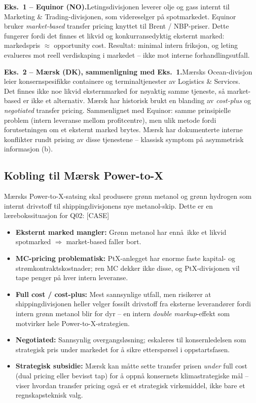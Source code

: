 \textbf{Eks.~1 -- Equinor (NO).}\quad [EKS]
Letingsdivisjonen leverer olje og gass internt til Marketing \& Trading-divisjonen, som videreselger på spotmarkedet. Equinor bruker \emph{market-based} transfer pricing knyttet til Brent / NBP-priser. Dette fungerer fordi det finnes et likvid og konkurransedyktig eksternt marked: markedspris $\approx$ opportunity cost. Resultat: minimal intern friksjon, og leting evalueres mot reell verdiskaping i markedet -- ikke mot interne forhandlingsutfall.

\textbf{Eks.~2 -- Mærsk (DK), sammenligning med Eks.~1.}\quad [EKS]
Mærsks Ocean-divisjon leier konsernspesifikke containere og terminaltjenester av Logistics \& Services. Det finnes ikke noe likvid eksternmarked for nøyaktig samme tjeneste, så market-based er ikke et alternativ. Mærsk har historisk brukt en blanding av \emph{cost-plus} og \emph{negotiated} transfer pricing. Sammenlignet med Equinor: samme prinsipielle problem (intern leveranse mellom profitcentre), men ulik metode fordi forutsetningen om et eksternt marked brytes. Mærsk har dokumenterte interne konflikter rundt prising av disse tjenestene -- klassisk symptom på asymmetrisk informasjon (b).

\subsection*{Kobling til Mærsk Power-to-X}
Mærsks Power-to-X-satsing skal produsere grønn metanol og grønn hydrogen som internt drivstoff til shippingdivisjonens nye metanol-skip. Dette er en lærebokssituasjon for Q02: [CASE]
\begin{itemize}\setlength{\itemsep}{2pt}
\item \textbf{Eksternt marked mangler:} Grønn metanol har enn\aa\ ikke et likvid spotmarked $\Rightarrow$ market-based faller bort.
\item \textbf{MC-pricing problematisk:} PtX-anlegget har enorme faste kapital- og strømkontraktskostnader; ren MC dekker ikke disse, og PtX-divisjonen vil tape penger på hver intern leveranse.
\item \textbf{Full cost / cost-plus:} Mest sannsynlige utfall, men risikerer at shippingdivisjonen heller velger fossilt drivstoff fra eksterne leverandører fordi intern grønn metanol blir for dyr -- en intern \emph{double markup}-effekt som motvirker hele Power-to-X-strategien.
\item \textbf{Negotiated:} Sannsynlig overgangsløsning; eskaleres til konsernledelsen som strategisk pris under markedet for å sikre etterspørsel i oppstartsfasen.
\item \textbf{Strategisk subsidie:} Mærsk kan måtte sette transfer prisen \emph{under} full cost (dual pricing eller bevisst tap) for å oppnå konsernets klimastrategiske mål -- viser hvordan transfer pricing også er et strategisk virkemiddel, ikke bare et regnskapsteknisk valg.
\end{itemize}


